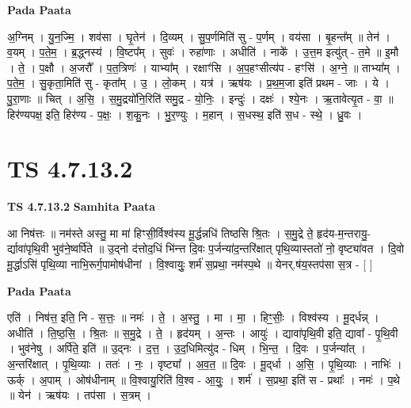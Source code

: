 \documentclass[17pt]{extarticle}
\begin{document}
\textbf{Pada Paata} \newline

अ॒ग्निम् । यु॒न॒ज्मि॒ । शव॑सा । घृ॒तेन॑ । दि॒व्यम् । सु॒प॒र्णमिति॑ सु - प॒र्णम् । वय॑सा । बृ॒हन्त᳚म् ॥ तेन॑ । व॒यम् । प॒ते॒म॒ । ब्र॒द्ध्नस्य॑ । वि॒ष्टप᳚म् । सुवः॑ । रुहा॑णाः । अधीति॑ । नाके᳚ । उ॒त्त॒म इत्यु॑त् - त॒मे ॥ इ॒मौ । ते॒ । प॒क्षौ । अ॒जरौ᳚ । प॒त॒त्रिणः॑ । याभ्या᳚म् । रक्षाꣳ॑सि । अ॒प॒हꣳसीत्य॑प - हꣳसि॑ । अ॒ग्ने॒ ॥ ताभ्या᳚म् । प॒ते॒म॒ । सु॒कृता॒मिति॑ सु - कृता᳚म् । उ॒ । लो॒कम् । यत्र॑ । ऋष॑यः । प्र॒थ॒म॒जा इति॑ प्रथम - जाः । ये । पु॒रा॒णाः ॥ चित् । अ॒सि॒ । स॒मु॒द्रयो॑नि॒रिति॑ समु॒द्र - यो॒निः॒ । इन्दुः॑ । दक्षः॑ । श्ये॒नः । ऋ॒तावेत्यृ॒त - वा॒ ॥ हिर॑ण्यपक्ष॒ इति॒ हिर॑ण्य - प॒क्षः॒ । श॒कु॒नः । भु॒र॒ण्युः । म॒हान् । स॒धस्थ॒ इति॑ स॒ध - स्थे॒ । ध्रु॒वः ।  \newline




\section*{ TS 4.7.13.2 }

\textbf{TS 4.7.13.2 } \newline
\textbf{Samhita Paata} \newline

आ निष॑त्तः ॥ नम॑स्ते अस्तु॒ मा मा॑ हिꣳसी॒र्विश्व॑स्य मू॒र्द्धन्नधि॑ तिष्ठसि श्रि॒तः । स॒मु॒द्रे ते॒ हृद॑य-म॒न्तरायु॒-र्द्यावा॑पृथि॒वी भुव॑ने॒ष्वर्पि॑ते ॥ उ॒द्नो द॑त्तोद॒धिं भि॑न्त्त दि॒वः प॒र्जन्या॑द॒न्तरि॑क्षात् पृथि॒व्यास्ततो॑ नो॒ वृष्ट्या॑वत । दि॒वो मू॒र्द्धाऽसि॑ पृथि॒व्या नाभि॒रूर्ग॒पामोष॑धीनां । वि॒श्वायुः॒ शर्म॑ स॒प्रथा॒ नम॑स्प॒थे ॥ येनर्.ष॑य॒स्तप॑सा स॒त्र - [  ] \newline

\textbf{Pada Paata} \newline

एति॑ । निष॑त्त॒ इति॒ नि - स॒त्तः॒ ॥ नमः॑ । ते॒ । अ॒स्तु॒ । मा । मा॒ । हिꣳ॒॒सीः॒ । विश्व॑स्य । मू॒द्‌र्धन्न् । अधीति॑ । ति॒ष्ठ॒सि॒ । श्रि॒तः ॥ स॒मु॒द्रे । ते॒ । हृद॑यम् । अ॒न्तः । आयुः॑ । द्यावा॑पृथि॒वी इति॒ द्यावा᳚ - पृ॒थि॒वी । भुव॑नेषु । अर्पि॑ते॒ इति॑ ॥ उ॒द्नः । द॒त्त॒ । उ॒द॒धिमित्यु॑द - धिम् । भि॒न्त॒ । दि॒वः । प॒र्जन्या᳚त् । अ॒न्तरि॑क्षात् । पृ॒थि॒व्याः । ततः॑ । नः॒ । वृष्ट्या᳚ । अ॒व॒त॒ ॥ दि॒वः । मू॒द्‌र्धा । अ॒सि॒ । पृ॒थि॒व्याः । नाभिः॑ । ऊर्क् । अ॒पाम् । ओष॑धीनाम् ॥ वि॒श्वायु॒रिति॑ वि॒श्व - आ॒युः॒ । शर्म॑ । स॒प्रथा॒ इति॑ स - प्रथाः᳚ । नमः॑ । प॒थे ॥ येन॑ । ऋष॑यः । तप॑सा । स॒त्रम् ।  \newline
\end{document}
